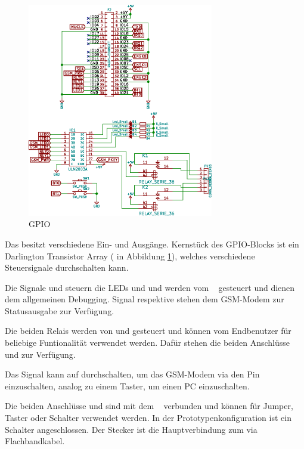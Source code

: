 \begin{figure}[h!t]
    \centering
    \includegraphics[width=0.725\textwidth]{images/superv-sch/supervisor--sch--gpio.eps}
    \caption{GPIO \Master}
    \label{fig:sch:master:gpio}
\end{figure}


Das  \Master   besitzt  verschiedene  Ein-  und   Ausg\"ange. Kernst\"uck  des
GPIO-Blocks  ist  ein Darlington  Transistor  Array  ( in  Abbildung
\ref{fig:sch:master:gpio}),  welches verschiedene  Steuersignale durchschalten
kann.

Die  Signale    und   steuern  die  LEDs    und
  und  werden  vom  \Raspi~  gesteuert  und  dienen  dem  allgemeinen
Debugging. Signal    respektive    stehen  dem
GSM-Modem zur Statusausgabe zur Verf\"ugung.

Die   beiden  Relais   werden  von     und     gesteuert
und  k\"onnen  vom  Endbenutzer   f\"ur  beliebige  Funtionalit\"at  verwendet
werden. Daf\"ur stehen  die beiden  Anschl\"usse  und   zur
Verf\"ugung.

Das Signal  kann auf  durchschalten, um das GSM-Modem
via den Pin   einzuschalten, analog zu einem  Taster, um einen
PC einzuschalten.

Die  beiden  Anschl\"usse    und   sind  mit  dem  \Raspi~
verbunden und k\"onnen f\"ur Jumper, Taster oder Schalter verwendet werden. In
der  Prototypenkonfiguration  ist   ein  Schalter  angeschlossen. Der  Stecker
 ist die Hauptverbindung zum \Raspi via Flachbandkabel.


